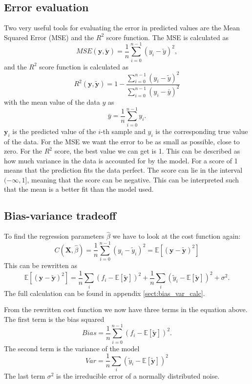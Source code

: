 \documentclass[12pt,a4paper,english]{article}
\begin{document}
\subsection{Error evaluation}
Two very useful tools for evaluating the error in predicted values are the Mean Squared Error (MSE) and the $R^2$ score function. The MSE is calculated as 
\begin{equation}
\label{eq:MSE}
MSE(\textbf{y}, \tilde{\textbf{y}})=\frac{1}{n}\sum_{i=0}^{n-1}(y_i-\tilde{y})^2,
\end{equation}
and the $R^2$ score function is calculated as
\begin{equation}
\label{eq:R2_score}
R^2(\textbf{y},\tilde{\textbf{y}})=1-\frac{\sum_{i=0}^{n-1}(y_i-\tilde{y})^2}{\sum_{i=0}^{n-1}(y_i-\bar{y})^2}
\end{equation}
with the mean value of the data $y$ as
\[\bar{y}=\frac{1}{n}\sum_{i=0}^{n-1}y_i.\]
$\textbf{y}_i$ is the predicted value of the $i$-th sample and $y_i$ is the corresponding true value of the data. For the MSE we want the error to be as small as possible, close to zero. For the $R^2$ score, the best value we can get is 1. This can be described as how much variance in the data is accounted for by the model. For a score of 1 means that the prediction fits the data perfect. The score can lie in the interval $(-\infty,1]$, meaning that the score can be negative. This can be interpreted such that the mean is a better fit than the model used.

\subsection{Bias-variance tradeoff}
To find the regression parameters $\hat{\beta}$ we have to look at the cost function again:
\begin{equation}
\label{eq:cost_func}
C(\textbf{X},\hat{\beta})=\frac{1}{n}\sum_{i=0}^{n-1}(y_i-\tilde{y}_i)^2= \mathds{E}[(\textbf{y}-\tilde{\textbf{y}})^2]
\end{equation}
This can be rewritten as 
\begin{equation}
\label{eq:bias_var}
\mathds{E}[(\textbf{y}-\tilde{\textbf{y}})^2]= \frac{1}{n}\sum_{i}(f_i-\mathds{E}[\tilde{\textbf{y}}])^2+ \frac{1}{n}\sum_{i}(\tilde{y}_i-\mathds{E}[\tilde{\textbf{y}}])^2+\sigma^2.
\end{equation}
The full calculation can be found in appendix \ref{sect:bias_var_calc}.

From the rewritten cost function we now have three terms in the equation above. The first term is the bias squared
\begin{equation}
\label{eq:Bias}
Bias=\frac{1}{n}\sum_{i=0}^{n-1}(f_i-\mathds{E}[\tilde{\textbf{y}}])^2.
\end{equation}
The second term is the variance of the model
\begin{equation}
\label{eq:var}
Var=\frac{1}{n}\sum_{i}(\tilde{y}_i-\mathds{E}[\tilde{\textbf{y}}])^2
\end{equation}
The last term $\sigma^2$ is the irreducible error of a normally distributed noise.
\end{document}
